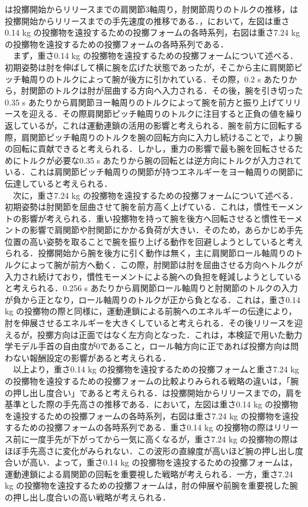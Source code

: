 は投擲開始からリリースまでの肩関節3軸周り，肘関節周りのトルクの推移，は投擲開始からリリースまでの手先速度の推移である．，において，左図は重さ0.14 kg の投擲物を遠投するための投擲フォームの各時系列，右図は重さ7.24 kg の投擲物を遠投するための投擲フォームの各時系列である．\\
　まず，重さ0.14 kg の投擲物を遠投するための投擲フォームについて述べる．初期姿勢は肘を伸ばして横に腕を広げた状態であったが，そこから主に肩関節ピッチ軸周りのトルクによって腕が後方に引かれている．その際，0.2 s あたりから，肘関節のトルクは肘が屈曲する方向へ入力される．その後，腕を引き切った0.35 s あたりから肩関節ヨー軸周りのトルクによって腕を前方と振り上げてリリースを迎える．その際肩関節ピッチ軸周りのトルクに注目すると正負の値を繰り返しているが，これは運動連鎖の活用の影響と考えられる．腕を前方に回転する際，肩関節ピッチ軸周りのトルクを腕の回転方向に入力し続けることで，より腕の回転に貢献できると考えられる．しかし，重力の影響で最も腕を回転させるためにトルクが必要な0.35 s あたりから腕の回転とは逆方向にトルクが入力されている．これは肩関節ピッチ軸周りの関節が持つエネルギーをヨー軸周りの関節に伝達していると考えられる．\\
　次に，重さ7.24 kg の投擲物を遠投するための投擲フォームについて述べる．初期姿勢は肘関節を屈曲させて腕を前方高く上げている．これは，慣性モーメントの影響が考えられる．重い投擲物を持って腕を後方へ回転させると慣性モーメントの影響で肩関節や肘関節にかかる負荷が大きい．そのため，あらかじめ手先位置の高い姿勢を取ることで腕を振り上げる動作を回避しようとしていると考えられる．投擲開始から腕を後方に引く動作は無く，主に肩関節ロール軸周りのトルクによって腕が前方へ動く．この際，肘関節は肘を屈曲させる方向へトルクが入力され続けており，慣性モーメントによる腕への負担を軽減しようとしていると考えられる．0.256 s あたりから肩関節ロール軸周りと肘関節のトルクの入力が負から正となり，ロール軸周りのトルクが正から負となる．これは，重さ0.14 kg の投擲物の際と同様に，運動連鎖による前腕へのエネルギーの伝達により，肘を伸展させるエネルギーを大きくしていると考えられる．その後リリースを迎えるが，投擲方向は正面ではなく左方向となった．これは，本検証で用いた動力学モデル手首の自由度が0であること，ロール軸方向に正であれば投擲方向は問わない報酬設定の影響があると考えられる．\\
　以上より，重さ0.14 kg の投擲物を遠投するための投擲フォームと重さ7.24 kg の投擲物を遠投するための投擲フォームの比較よりみられる戦略の違いは，「腕の押し出し度合い」であると考えられる．は投擲開始からリリースまでの，肩を基準とした際の手先高さの推移である．において，左図は重さ0.14 kg の投擲物を遠投するための投擲フォームの各時系列，右図は重さ7.24 kg の投擲物を遠投するための投擲フォームの各時系列である．重さ0.14 kg の投擲物の際はリリース前に一度手先が下がってから一気に高くなるが，重さ7.24 kg の投擲物の際はほぼ手先高さに変化がみられない．この波形の直線度が高いほど腕の押し出し度合いが高い．よって，重さ0.14 kg の投擲物を遠投するための投擲フォームは，運動連鎖による肩関節の回転を重要視した戦略が考えられる．一方，重さ7.24 kg の投擲物を遠投するための投擲フォームは，肘の伸展や前腕を重要視した腕の押し出し度合いの高い戦略が考えられる．

